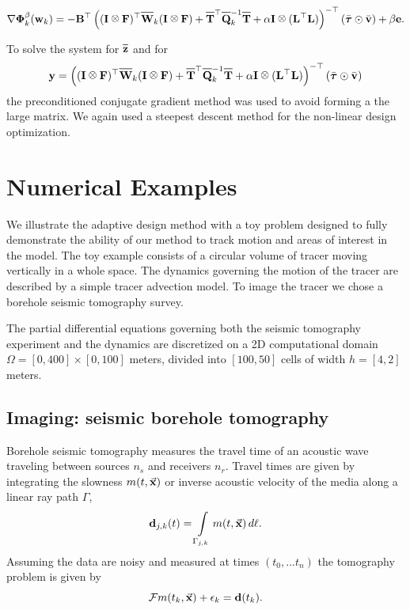 \documentclass[11pt]{article}
\newcommand{\bfB}	{{\bf{B}}}
\newcommand{\bfF}	{{\bf{F}}}
\newcommand{\bfI}	{{\bf{I}}}
\newcommand{\bfL}	{{\bf{L}}}
\newcommand{\bfd}	{{\bf{d}}}
\newcommand{\bfe}	{{\bf{e}}}
\newcommand{\bfv}	{{\bf{v}}}
\newcommand{\bfw}	{{\bf{w}}}
\newcommand{\bfy}	{{\bf{y}}}
\newcommand{\bfPhi}     {{\boldsymbol \Phi}}
\newcommand{\bftau}      {{\boldsymbol \tau}}
\newcommand{\LtL}       { \bfL^{\top}\bfL}
\newcommand {\vx}    {\vec {\bf x}}
\newcommand{\CF} 	 {\mathcal{F}}    %
\newcommand*\xbar[1]{%
  \hbox{%
    \vbox{%
      \hrule height 0.5pt %
      \kern0.5ex%
      \hbox{%
        \kern-0.em%
        \ensuremath{#1}%
        \kern-0.01em%
      }%
    }%
  }%
}
\newcommand{\zbar}	{\xbar{\bf z}}
\newcommand{\Qbar}	{\xbar{\bf Q}}
\newcommand{\Wbar}	{\xbar{\bf W}}
\newcommand{\Tbar}	{\xbar{\bf T}}
\def\kronecker{\raisebox{1pt}{\ensuremath{\:\otimes\:}}}
\begin{document}
\begin{equation}
\nabla \bfPhi_k^{\beta}(\bfw_k) = -\bfB^{\top}\left((\bfI \kronecker \bfF)^{\top}\Wbar_k(\bfI \kronecker \bfF)  +
\Tbar^{\top}\Qbar^{-1}_k\Tbar + \alpha \bfI \kronecker(\LtL)
\right)^{- \top}(\bar{\bftau} \odot \bar{\bfv}) + \beta\bfe.
\end{equation}

To solve the system for $\zbar$ and for
\begin{equation}
\bfy = \left((\bfI \kronecker \bfF)^{\top}\Wbar_k(\bfI \kronecker \bfF)  +
\Tbar^{\top}\Qbar^{-1}_k\Tbar + \alpha \bfI \kronecker(\LtL)
\right)^{- \top}(\bar{\bftau} \odot \bar{\bfv}) 
\end{equation}
the preconditioned conjugate gradient method was used 
to avoid forming a the large matrix. We again used a steepest descent method for the non-linear design optimization. 


\section{Numerical Examples }
\label{sec: Example1}
We illustrate the adaptive  design method  with a toy problem designed to fully demonstrate the ability of our method to track  motion and areas of interest in the model. The toy  example consists of a  circular volume of tracer  moving vertically in a whole space. The dynamics governing the motion of the tracer are described by a simple tracer  advection model. 
To image the tracer we chose a   borehole seismic tomography survey.

The partial differential equations governing both the seismic tomography experiment and the dynamics are discretized on a  2D computational domain  $\Omega=[0, 400] \times [0, 100]$ meters,  divided into $[100, 50]$ cells of width $h = [4,2]$ meters.


\subsection{Imaging: seismic borehole tomography}
 Borehole seismic tomography  measures the travel time of an acoustic wave traveling between sources $n_s$ and receivers $n_r$. Travel times are given by integrating the slowness  $m(t,\vx)$  or inverse acoustic velocity of the media  along a linear ray path $\Gamma$,
\begin{equation}\label{eq:tomo}
\bfd_{j,k}(t) =  \int\limits_{\Gamma_{j,k}} m(t,\vx)\, d\ell.
\end{equation}
 Assuming the data are noisy and measured at times $(t_0,...t_n)$ the tomography problem is given by 
 \begin{equation*}
 \CF m(t_{k},\vx) + \epsilon_{k}  = \bfd(t_{k}).\\
\end{equation*}
\end{document}
